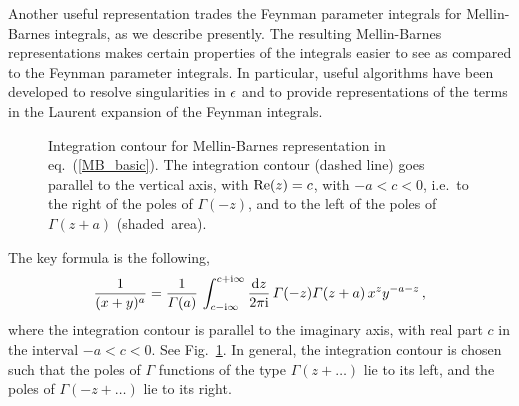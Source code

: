 Another useful representation 
trades the Feynman parameter integrals
for Mellin-Barnes integrals, as we describe 
presently. 
The resulting Mellin-Barnes representations makes certain properties of the integrals easier to see as compared to the Feynman parameter integrals. In particular, useful algorithms have been developed to resolve singularities in $\epsilon$ and to provide representations of the terms in the Laurent expansion of the Feynman integrals.
%
\begin{figure}[t]
\centering
{}
\caption{Integration contour for Mellin-Barnes representation in eq.~(\ref{MB_basic}). The integration contour (dashed line) goes parallel to the vertical axis, with ${\rm Re}(z)=c$, with $-a<c<0$, i.e.\ to the right of the poles of $\Gamma(-z)$, and to the left of the poles of  $\Gamma(z+a)$ (shaded~area).}
\label{fig:mb1}
\end{figure}
%
The key formula is the following,
\begin{align}\label{MB_basic}
\frac{1}{(x+y)^{a}} = \frac{1}{\Gamma(a)} \, \int_{c - \i \infty}^{c+\i \infty} \frac{\d z}{2 \pi \i} \, \Gamma(-z) \Gamma(z+a) \, x^z y^{-a-z} \,,
\end{align}
where the integration contour is parallel to the imaginary axis, with real part $c$ in the interval $-a<c<0$.
See Fig.~\ref{fig:mb1}. In general, the integration contour is chosen such that the poles of $\Gamma$ functions of the type $\Gamma(z+\ldots )$ lie to its left, and the poles of  $\Gamma(-z+\ldots)$ lie to its right.

